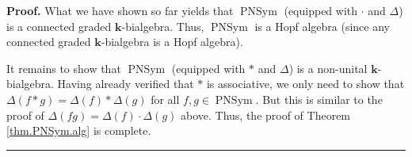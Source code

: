 \documentclass[numbers=enddot,12pt,final,onecolumn,notitlepage]{scrartcl}%
\theoremstyle{definition}
\newenvironment{proof}[1][Proof]{\noindent\textbf{#1.} }{\ \rule{0.5em}{0.5em}}
\begin{document}
\begin{proof}
What we have shown so far yields that $\operatorname*{PNSym}$ (equipped with
$\cdot$ and $\Delta$) is a connected graded $\mathbf{k}$-bialgebra. Thus,
$\operatorname*{PNSym}$ is a Hopf algebra (since any connected graded
$\mathbf{k}$-bialgebra is a Hopf algebra).

It remains to show that $\operatorname*{PNSym}$ (equipped with $\ast$ and
$\Delta$) is a non-unital $\mathbf{k}$-bialgebra. Having already verified that
$\ast$ is associative, we only need to show that $\Delta\left(  f\ast
g\right)  =\Delta\left(  f\right)  \ast\Delta\left(  g\right)  $ for all
$f,g\in\operatorname*{PNSym}$. But this is similar to the proof of
$\Delta\left(  fg\right)  =\Delta\left(  f\right)  \cdot\Delta\left(
g\right)  $ above. Thus, the proof of Theorem \ref{thm.PNSym.alg} is complete.
\end{proof}
\end{document}
